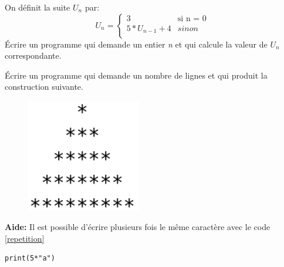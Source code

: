 \documentclass[a4paper,11pt]{article}
\begin{document}
\begin{Form}
\begin{exo}
On définit la suite $U_n$ par:
$$
U_n = \left\{
    \begin{array}{ll}
        3 & \mbox{si  n = 0}\\
        5*U_{n-1} + 4 & sinon\\
    \end{array}
\right.
$$
Écrire un programme qui demande un entier \emph{n} et qui calcule la valeur de $U_n$ correspondante.
\end{exo}
\begin{exo}
Écrire un programme qui demande un nombre de lignes et qui produit la construction suivante.

\begin{figure}[!h]
\centering
\includegraphics[width=5cm]{ressources/etoile.png}
\label{etoile}
\end{figure}

\textbf{Aide:} Il est possible d'écrire plusieurs fois le même caractère avec le code \ref{repetition}
\begin{code}[!h]
\begin{lstlisting}
print(5*"a")
\end{lstlisting}
\label{repetition}
\end{code}
\end{exo}
\end{Form}
\end{document}
